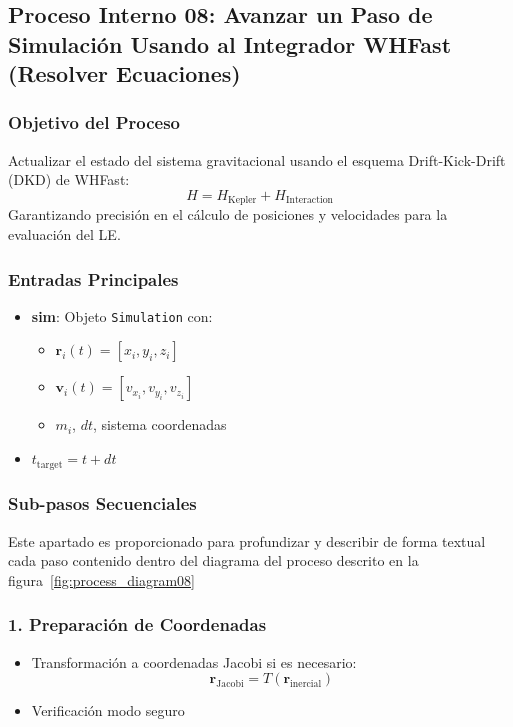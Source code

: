 \subsection[Proceso Interno 08: Resolver Ecuaciones]{Proceso Interno 08: Avanzar un Paso de Simulación Usando al Integrador WHFast (Resolver Ecuaciones)}

\subsubsection{Objetivo del Proceso}
Actualizar el estado del sistema gravitacional usando el esquema Drift-Kick-Drift (DKD) de WHFast:
\[
H = H_{\text{Kepler}} + H_{\text{Interaction}}
\]
Garantizando precisión en el cálculo de posiciones y velocidades para la evaluación del LE.\

\subsubsection{Entradas Principales}
\begin{itemize}
    \item \textbf{sim}: Objeto \texttt{Simulation} con:
    \begin{itemize}
        \item $\mathbf{r}_i(t) = [x_i, y_i, z_i]$
        \item $\mathbf{v}_i(t) = [v_{x_i}, v_{y_i}, v_{z_i}]$
        \item $m_i$, $dt$, sistema coordenadas
    \end{itemize}
    \item $t_{\text{target}} = t + dt$
\end{itemize}

\subsubsection{Sub-pasos Secuenciales}
Este apartado es proporcionado para profundizar y describir de forma textual cada paso contenido dentro del diagrama del proceso descrito en la figura~\ref{fig:process_diagram08}
\subsubsection*{1. Preparación de Coordenadas}
\begin{itemize}
    \item Transformación a coordenadas Jacobi si es necesario:
    \[
    \mathbf{r}_{\text{Jacobi}} = T(\mathbf{r}_{\text{inercial}})
    \]
    \item Verificación modo seguro
\end{itemize}


